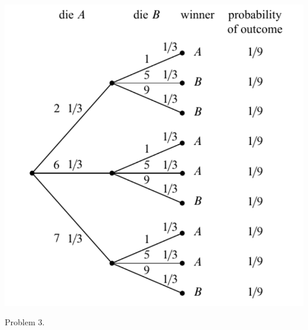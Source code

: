 \begin{frame}
  \begin{block}{}
    \begin{center}
      \includegraphics[scale=0.55]{fig177.pdf}
    \end{center}
  \end{block}
\end{frame}
 
\begin{frame}
  \begin{xrcs}
   Problem 3.
  \end{xrcs}
\end{frame}




